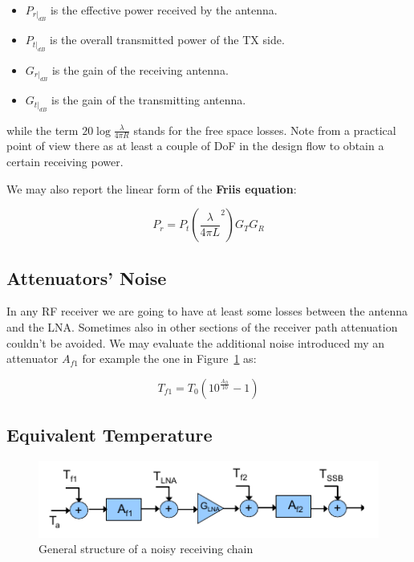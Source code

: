 \begin{itemize}
	\item $P_{r|_{dB}}$ is the effective power received by the antenna.
	\item $P_{t|_{dB}}$ is the overall transmitted power of the TX side.
	\item $G_{r|_{dB}}$ is the gain of the receiving antenna.
	\item $G_{t|_{dB}}$ is the gain of the transmitting antenna.
\end{itemize}

while the term $20\log{ \frac{\lambda}{4 \pi R} }$ stands for the free space losses.
Note from a practical point of view there as at least a couple of DoF in the design flow to obtain a certain receiving power.

We may also report the linear form of the \textbf{Friis equation}:

\begin{equation}
P_r = P_t  \left( \frac { \lambda } {4 \pi L}^2 \right) G_T G_R
\end{equation}




\subsection{Attenuators' Noise} %
\label{sub:noise_of_attenuators}

In any RF receiver we are going to have at least some losses between the antenna and the LNA. Sometimes also in other sections of the receiver path attenuation couldn't be avoided.
We may evaluate the additional noise introduced my an attenuator $A_{f1}$ for example the one in Figure~\ref{fig:Teq} as:

\begin{equation}
	T_{f1} = T_0 (10^{ \frac {A_{f1}} {10} }-1)
\end{equation}




\subsection{Equivalent Temperature} %
\label{sub:equivalent_temperature}

\begin{figure} [h!]
	\centering
	\includegraphics[scale=1]{Immagini/Teq}
	
	\caption{General structure of a noisy receiving chain}
	\label{fig:Teq}
\end{figure}


